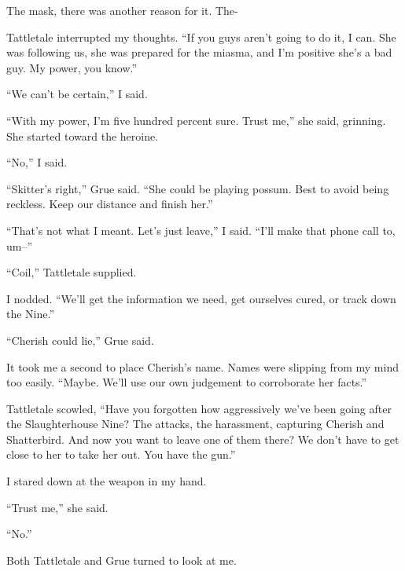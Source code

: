 The mask, there was another reason for it.  The-



Tattletale interrupted my thoughts.  ``If you guys aren't going to do it, I can.  She was following us, she was prepared for the miasma, and I'm positive she's a bad guy.  My power, you know.''



``We can't be certain,'' I said.



``With my power, I'm five hundred percent sure.  Trust me,'' she said, grinning.  She started toward the heroine.



``No,'' I said.



``Skitter's right,'' Grue said.  ``She could be playing possum.  Best to avoid being reckless.  Keep our distance and finish her.''



``That's not what I meant.  Let's just leave,'' I said.  ``I'll make that phone call to, um--''



``Coil,'' Tattletale supplied.



I nodded.  ``We'll get the information we need, get ourselves cured, or track down the Nine.''



``Cherish could lie,'' Grue said.



It took me a second to place Cherish's name.  Names were slipping from my mind too easily.  ``Maybe.  We'll use our own judgement to corroborate her facts.''



Tattletale scowled, ``Have you forgotten how aggressively we've been going after the Slaughterhouse Nine?  The attacks, the harassment, capturing Cherish and Shatterbird.  And now you want to leave one of them there?  We don't have to get close to her to take her out.  You have the gun.''



I stared down at the weapon in my hand.



``Trust me,'' she said.



``No.''



Both Tattletale and Grue turned to look at me.



